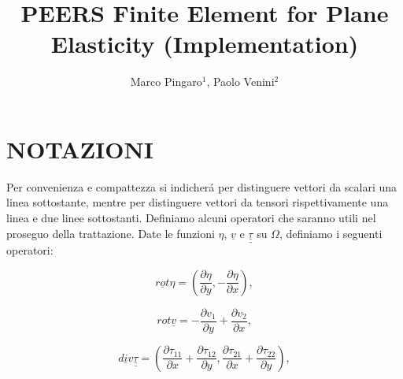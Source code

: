 \documentclass[a4paper,10pt]{article}
\title{PEERS Finite Element for Plane Elasticity (Implementation)}
\author{Marco Pingaro$^{1}$, Paolo Venini$^{2}$}
\begin{document}



%
\section{NOTAZIONI} \label{cap:notazioni}
Per convenienza e compattezza si indicher\'{a} per distinguere vettori da scalari una linea sottostante,
mentre per distinguere vettori da tensori rispettivamente una linea e due linee sottostanti.
Definiamo alcuni operatori che saranno utili nel proseguo della trattazione.
Date le funzioni $\eta$, $\underline{v}$ e $\underline{\underline{\tau}}$ su $\Omega$, definiamo i seguenti operatori:

\begin{equation} \label{def:rotore-scalare}
\underline{rot}\eta=\left(\frac{\partial\eta}{\partial y},-\frac{\partial\eta}{\partial x}\right),
\end{equation}

\begin{equation} \label{def:rotore-vett}
rot \underline{v} = -\frac{\partial v_{1}}{\partial y}+\frac{\partial v_{2}}{\partial x},
\end{equation}

\begin{equation} \label{def:divergenza-tens}
\underline{div}\underline{\underline{\tau}} = \left(\frac{\partial\tau_{11}}{\partial x}+
\frac{\partial\tau_{12}}{\partial y},\frac{\partial\tau_{21}}{\partial x}+
\frac{\partial\tau_{22}}{\partial y}\right),
\end{equation}
\end{document}
